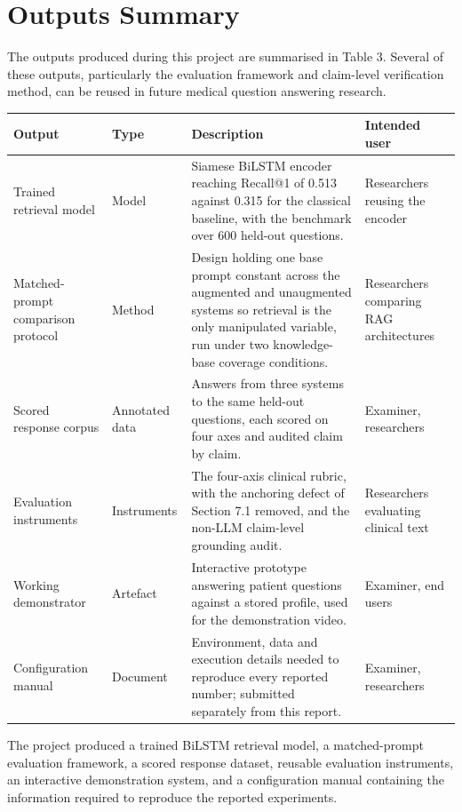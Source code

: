 \section{Outputs Summary}
\label{sec:Outputs}

The outputs produced during this project are summarised in Table 3. Several of these outputs, particularly the evaluation framework and claim-level verification method, can be reused in future medical question answering research.

\label{tab:3}
\begin{center}
\scriptsize
\setlength{\tabcolsep}{4pt}
\begin{tabular}{>{\raggedright\arraybackslash}p{}>{\raggedright\arraybackslash}p{}>{\raggedright\arraybackslash}p{}>{\raggedright\arraybackslash}p{}}
\toprule
\textbf{Output} & \textbf{Type} & \textbf{Description} & \textbf{Intended user} \\
\midrule
Trained retrieval model & Model & Siamese BiLSTM encoder reaching Recall@1 of 0.513 against 0.315 for the classical baseline, with the benchmark over 600 held-out questions. & Researchers reusing the encoder \\
Matched-prompt comparison protocol & Method & Design holding one base prompt constant across the augmented and unaugmented systems so retrieval is the only manipulated variable, run under two knowledge-base coverage conditions. & Researchers comparing RAG architectures \\
Scored response corpus & Annotated data & Answers from three systems to the same held-out questions, each scored on four axes and audited claim by claim. & Examiner, researchers \\
Evaluation instruments & Instruments & The four-axis clinical rubric, with the anchoring defect of Section 7.1 removed, and the non-LLM claim-level grounding audit. & Researchers evaluating clinical text \\
Working demonstrator & Artefact & Interactive prototype answering patient questions against a stored profile, used for the demonstration video. & Examiner, end users \\
Configuration manual & Document & Environment, data and execution details needed to reproduce every reported number; submitted separately from this report. & Examiner, researchers \\
\bottomrule
\end{tabular}
\end{center}

The project produced a trained BiLSTM retrieval model, a matched-prompt evaluation framework, a scored response dataset, reusable evaluation instruments, an interactive demonstration system, and a configuration manual containing the information required to reproduce the reported experiments.
